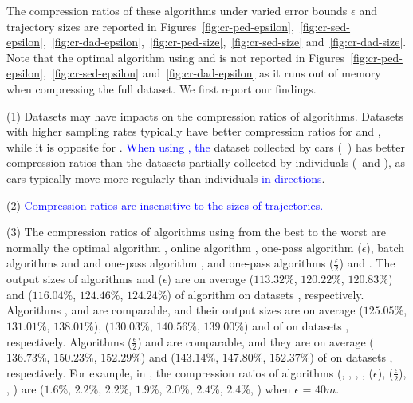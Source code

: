 The compression ratios of these algorithms under varied error bounds $\epsilon$ and trajectory sizes are reported in Figures~\ref{fig:cr-ped-epsilon},~\ref{fig:cr-sed-epsilon},~\ref{fig:cr-dad-epsilon},~\ref{fig:cr-ped-size},~\ref{fig:cr-sed-size} and~\ref{fig:cr-dad-size}.
{Note that the optimal algorithm using \sed and \dad is not reported in Figures~\ref{fig:cr-ped-epsilon},~\ref{fig:cr-sed-epsilon} and~\ref{fig:cr-dad-epsilon} as it runs out of memory when compressing the full dataset}. We first report our findings.


\sstab(1)  {Datasets may have impacts on the compression ratios of \lsa algorithms. Datasets with higher sampling rates typically have better compression ratios for \ped and \sed, while it is opposite for \dad. \textcolor{blue}{When using \dad, the} dataset collected by cars (\eg~\ucar) has better compression ratios than the datasets partially collected by individuals (\eg~\geolife and \mopsi), as cars typically move more regularly than individuals \textcolor{blue}{in directions}.}

\sstab(2) \textcolor{blue}{Compression ratios are insensitive to the sizes of trajectories.} 

\sstab(3) The compression ratios of algorithms using \ped from the best
to the worst are normally the optimal algorithm \opt, online algorithm \bqsa, one-pass algorithm \siped($\epsilon$), batch algorithms \tpa and \dpa and one-pass algorithm , and one-pass algorithms \siped($\frac{\epsilon}{2}$) and \operb.
The output sizes of algorithms \bqsa and \siped({$\epsilon$}) are on average
($113.32\%$, $120.22\%$, $120.83\%$) and ($116.04\%$, $124.46\%$, $124.24\%$) of algorithm \opt
on datasets \dSets, respectively.
Algorithms \tpa, \dpa and  are comparable, and their output sizes are on average
($125.05\%$, $131.01\%$, $138.01\%$), ($130.03\%$, $140.56\%$, $139.00\%$) and  of \opt
on datasets \dSets, respectively.
Algorithms \siped($\frac{\epsilon}{2}$) and \operb are comparable, and they are on average
($136.73\%$, $150.23\%$, $152.29\%$) and ($143.14\%$, $147.80\%$, $152.37\%$) of \opt on datasets \dSets, respectively.
%
For example, in \mopsi, the compression ratios of algorithms
(\opt, \tpa, \dpa, \bqsa, \siped(${\epsilon}$), \siped($\frac{\epsilon}{2}$), \operb,  ) are ($1.6\%$, $2.2\%$, $2.2\%$, $1.9\%$, $2.0\%$, $2.4\%$, $2.4\%$, ) when $\epsilon$ = $40m$.
%


